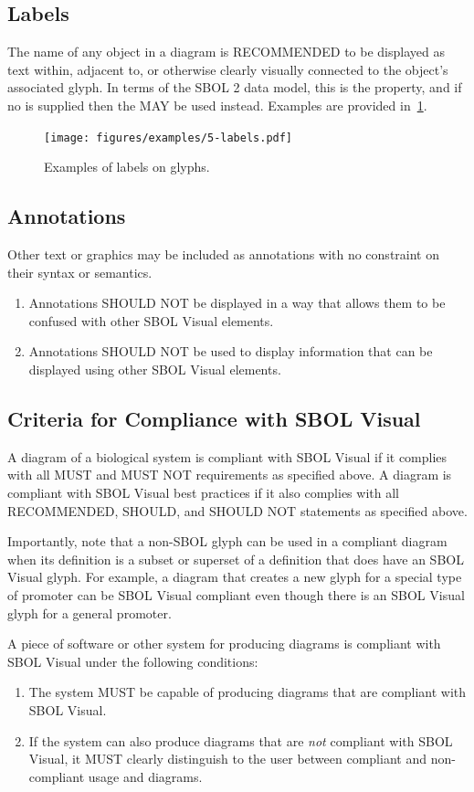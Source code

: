 \subsection{Labels}
The name of any object in a diagram is RECOMMENDED to be displayed as text within, adjacent to, or otherwise clearly visually connected to the object's associated glyph.  In terms of the SBOL 2 data model, this is the  property, and if no  is supplied then the  MAY be used instead.
Examples are provided in~\ref{exa:5}.

	\begin{figure}[h!]
	\centering
	\texttt{[image: figures/examples/5-labels.pdf]}
	\caption{Examples of labels on glyphs.}
	\label{exa:5}
	\end{figure}


\subsection{Annotations}
Other text or graphics may be included as annotations with no constraint on their syntax or semantics.

\begin{enumerate}
\item Annotations SHOULD NOT be displayed in a way that allows them to be confused with other SBOL Visual elements.
\item Annotations SHOULD NOT be used to display information that can be displayed using other SBOL Visual elements.
\end{enumerate}

\subsection{Criteria for Compliance with SBOL Visual}

A diagram of a biological system is compliant with SBOL Visual if it complies with all MUST and MUST NOT requirements as specified above.
A diagram is compliant with SBOL Visual best practices if it also complies with all RECOMMENDED, SHOULD, and SHOULD NOT statements as specified above.

Importantly, note that a non-SBOL glyph can be used in a compliant
diagram when its definition is a subset or superset of a definition that
does have an SBOL Visual glyph.  For example, a diagram that creates a
new glyph for a special type of promoter can be SBOL Visual compliant
even though there is an SBOL Visual glyph for a general promoter.

A piece of software or other system for producing diagrams is
compliant with SBOL Visual under the following conditions:
\begin{enumerate}
\item The system MUST be capable of producing diagrams that are
  compliant with SBOL Visual.
\item If the system can also produce diagrams that are {\em not}
  compliant with SBOL Visual, it MUST clearly distinguish to the user
  between compliant and non-compliant usage and diagrams.
\end{enumerate}

